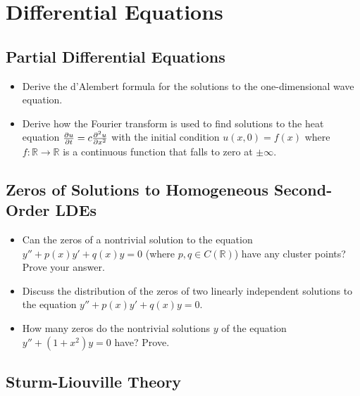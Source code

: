 \section{Differential Equations}

\subsection{Partial Differential Equations}

\begin{itemize}

	\item Derive the d'Alembert formula for the solutions to the one-dimensional wave equation.
	\item Derive how the Fourier transform is used to find solutions to the heat equation $ \pdv{u}{t} = c \pdv[2]{u}{x} $ with the initial condition $ u(x, 0) = f(x) $ where $ f: \mathbb{R} \to \mathbb{R} $ is a continuous function that falls to zero at $ \pm \infty $.

\end{itemize}

\subsection{Zeros of Solutions to Homogeneous Second-Order LDEs}

\begin{itemize}
		
	\item Can the zeros of a nontrivial solution to the equation $ y'' + p(x)y' + q(x)y = 0 $ (where $ p, q \in C(\mathbb{R}) $) have any cluster points? Prove your answer.
	
	\item Discuss the distribution of the zeros of two linearly independent solutions to the equation  $ y'' + p(x)y' + q(x)y = 0 $.
	
	\item How many zeros do the nontrivial solutions $ y $ of the equation $ y'' + (1+x^2)y = 0 $ have? Prove.
	
\end{itemize}

\subsection{Sturm-Liouville Theory}

